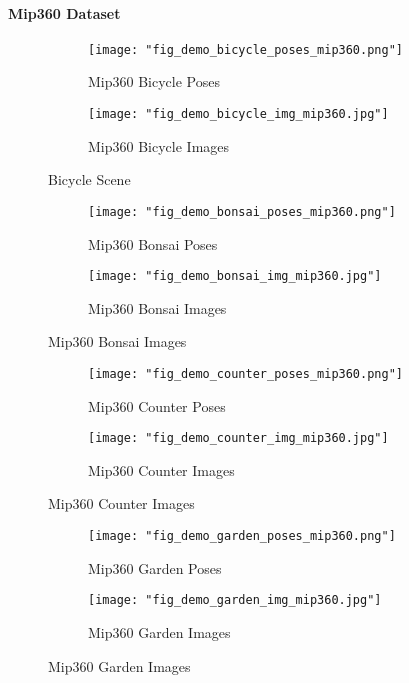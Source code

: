 \paragraph{Mip360 Dataset}

\begin{figure}
    \centering
    \begin{subfigure}{0.48\linewidth}
        \texttt{[image: "fig\_demo\_bicycle\_poses\_mip360.png"]}
        \caption{Mip360 Bicycle Poses}
    \end{subfigure}
    \begin{subfigure}{0.48\linewidth}
        \texttt{[image: "fig\_demo\_bicycle\_img\_mip360.jpg"]}
        \caption{Mip360 Bicycle Images}
    \end{subfigure}
    \caption{Bicycle Scene}
    \label{mip360:dataset:bicycle}
\end{figure}

\begin{figure}
    \centering
        \begin{subfigure}{0.48\linewidth}
            \texttt{[image: "fig\_demo\_bonsai\_poses\_mip360.png"]}
            \caption{Mip360 Bonsai Poses}
        \end{subfigure}
        \begin{subfigure}{0.48\linewidth}
            \texttt{[image: "fig\_demo\_bonsai\_img\_mip360.jpg"]}
            \caption{Mip360 Bonsai Images}
        \end{subfigure}
\end{figure}

\begin{figure}
    \centering
        \begin{subfigure}{0.48\linewidth}
            \texttt{[image: "fig\_demo\_counter\_poses\_mip360.png"]}
            \caption{Mip360 Counter Poses}
        \end{subfigure}
        \begin{subfigure}{0.48\linewidth}
            \texttt{[image: "fig\_demo\_counter\_img\_mip360.jpg"]}
            \caption{Mip360 Counter Images}
        \end{subfigure}
\end{figure}

\begin{figure}
    \centering
        \begin{subfigure}{0.48\linewidth}
            \texttt{[image: "fig\_demo\_garden\_poses\_mip360.png"]}
            \caption{Mip360 Garden Poses}
        \end{subfigure}
        \begin{subfigure}{0.48\linewidth}
            \texttt{[image: "fig\_demo\_garden\_img\_mip360.jpg"]}
            \caption{Mip360 Garden Images}
        \end{subfigure}
\end{figure}


